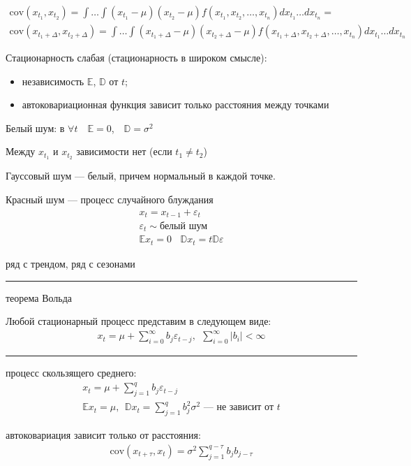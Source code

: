 \documentclass{book}
\begin{document}
\begin{gather*}
  \mathrm{cov}(x_{t_1},x_{t_2})=\int \dots \int {(x_{t_1}-\mu)(x_{t_2}-\mu)f(x_{t_1},x_{t_2},\dots,x_{t_n}) dx_{t_1}\dots dx_{t_n}}=\\
  \mathrm{cov}(x_{t_1+\Delta},x_{t_2+\Delta})=\int \dots \int {(x_{t_1+\Delta}-\mu)(x_{t_2+\Delta}-\mu)f(x_{t_1+\Delta},x_{t_2+\Delta},\dots,x_{t_n}) dx_{t_1}\dots dx_{t_n}}
\end{gather*}

Стационарность слабая (стационарность в широком смысле):

\begin{itemize}
    \item независимость $\mathbb{E}$, $\mathbb{D}$ от $t$;
    \item автоковариационная функция зависит только расстояния между точками
\end{itemize}

Белый шум:
в $\forall t$~~$\mathbb{E}=0$,~~$\mathbb{D}=\sigma^2$ 

Между $x_{t_1}$ и $x_{t_2}$ зависимости нет (если $t_1\neq t_2$)

Гауссовый шум --- белый, причем нормальный в каждой точке.

Красный шум --- процесс случайного блуждания
\begin{gather*}
  x_t=x_{t-1}+\varepsilon_t\\
  \varepsilon_t \sim \textrm{белый шум}\\
  \mathbb{E}x_t=0~~~~\mathbb{D}x_t=t\mathbb{D}\varepsilon
\end{gather*}

ряд с трендом, ряд с сезонами

\hrule

теорема Вольда

Любой стационарный процесс представим в следующем виде:
\begin{gather*}
    x_t=\mu+\sum_{i=0}^{\infty} {b_j\varepsilon_{t-j}},~~\sum_{i=0}^{\infty} {|b_i|}<\infty
\end{gather*}

\hrule

процесс скользящего среднего:
\begin{gather*}
  x_t=\mu+\sum_{j=1}^{q} {b_j\varepsilon_{t-j}}\\
  \mathbb{E}x_t=\mu,~~\mathbb{D}x_t=\sum_{j=1}^{q} {b_j^2\sigma^2}\textrm{ --- не зависит от $t$}
\end{gather*}

автоковариация зависит только от расстояния:
\begin{gather*}
  \mathrm{cov}(x_{t+\tau},x_t)=\sigma^2 \sum_{j=1}^{q-\tau} {b_jb_{j-\tau}}
\end{gather*}
\end{document}
